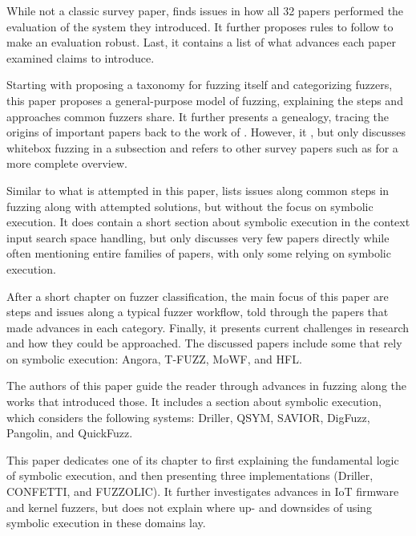 \documentclass{article}
\begin{document}
\begin{multicols}{2}
    While not a classic survey paper,  finds issues in how all 32 papers performed the evaluation of the system they introduced. It further proposes rules to follow to make an evaluation robust. Last, it contains a list of what advances each paper examined claims to introduce.

    Starting with proposing a taxonomy for fuzzing itself and categorizing fuzzers, this paper proposes a general-purpose model of fuzzing, explaining the steps and approaches common fuzzers share. It further presents a genealogy, tracing the origins of important papers back to the work of \citeauthor{UNIX}. However, it \cite{ArtScienceEng}, but only discusses whitebox fuzzing in a subsection and refers to other survey papers such as \cite{Orchestrated, AllYouEverWanted} for a more complete overview.

    Similar to what is attempted in this paper,  lists issues along common steps in fuzzing along with attempted solutions, but without the focus on symbolic execution. It does contain a short section about symbolic execution in the context input search space handling, but only discusses very few papers directly while often mentioning entire families of papers, with only some relying on symbolic execution.

    After a short chapter on fuzzer classification, the main focus of this paper are steps and issues along a typical fuzzer workflow, told through the papers that made advances in each category. Finally, it presents current challenges in research and how they could be approached. The discussed papers include some that rely on symbolic execution: Angora\cite{Angora}, T-FUZZ\cite{TFuzz}, MoWF\cite{MoWF}, and HFL\cite{HFL}.

    The authors of this paper guide the reader through advances in fuzzing along the works that introduced those. It includes a section about symbolic execution, which considers the following systems: Driller\cite{Driller}, QSYM\cite{QSYM}, SAVIOR\cite{SAVIOR}, DigFuzz\cite{DigFuzz}, Pangolin\cite{Pangolin}, and QuickFuzz\cite{QuickFuzz}.

    This paper dedicates one of its chapter to first explaining the fundamental logic of symbolic execution, and then presenting three implementations (Driller\cite{Driller}, CONFETTI\cite{CONFETTI}, and FUZZOLIC\cite{FUZZOLIC}). It further investigates advances in IoT firmware and kernel fuzzers, but does not explain where up- and downsides of using symbolic execution in these domains lay.


\end{multicols}
\end{document}
